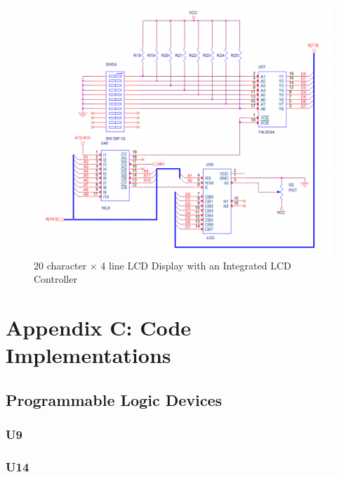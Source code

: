         \begin{figure}[ht]
            \begin{center}
                \includegraphics[width=1\textwidth]{figures/schematics/lcd.png}
                \caption{20 character $\times$ 4 line LCD Display with an Integrated LCD Controller} \label{fig:page11}
            \end{center}
        \end{figure}


    \clearpage
    \newpage

    \section{Appendix C: Code Implementations} \label{appendix:code}

        \subsection{Programmable Logic Devices}

            \subsubsection{U9}


            \newpage
            \subsubsection{U14}

